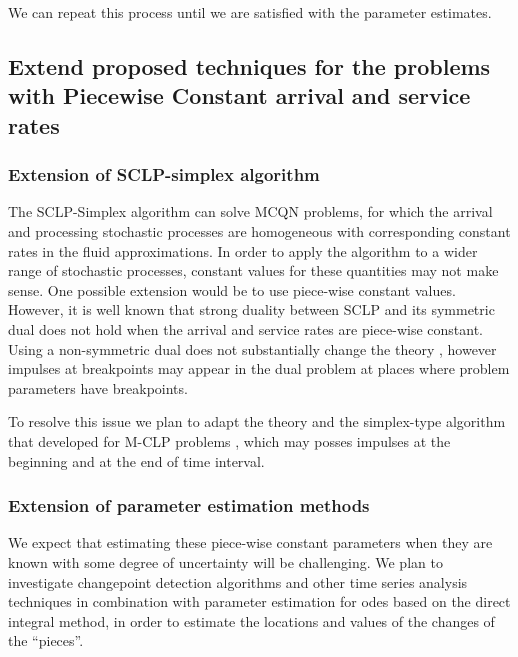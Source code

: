 \documentclass[11pt,a4paper,titlepage]{article}
\theoremstyle{definition}
\theoremstyle{plain}
\begin{document}
    We can repeat this process until we are satisfied with the parameter estimates.



    \subsection{Extend proposed techniques for the problems with Piecewise Constant arrival and service rates}
    \label{subsec:topics:sclp-piecewise}
    \subsubsection{Extension of SCLP-simplex algorithm}
    The SCLP-Simplex algorithm can solve MCQN problems,
    for which the arrival and processing stochastic processes are homogeneous
    with corresponding constant rates in the fluid approximations.
    In order to apply the algorithm to a wider range of stochastic processes,
    constant values for these quantities may not make sense.
    One possible extension would be to use piece-wise constant values.
    However,
    it is well known that strong duality between SCLP and its symmetric dual does not hold when the arrival and service rates are piece-wise constant.
    Using a non-symmetric dual does not substantially change the theory \autocite{pullan1993algorithm,shapiro2001duality},
    however impulses at breakpoints may appear in the dual problem at places where problem parameters have breakpoints.

    To resolve this issue we plan to adapt the theory and the simplex-type algorithm that developed for M-CLP problems \autocite{shindin2014symmetric,shindin2015structure,shindin2020simplex}, which may posses impulses at the beginning and at the end of time interval.

    \subsubsection{Extension of parameter estimation methods}
    We expect that estimating these piece-wise constant parameters when they are known with some degree of uncertainty will be challenging.
    We plan to investigate changepoint detection algorithms and other time series analysis techniques in combination with parameter estimation for \glspl{ode} based on the direct integral method,
    in order to estimate the locations and values of the changes of the ``pieces''.

\end{document}
